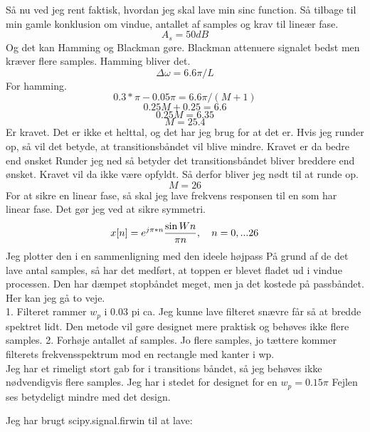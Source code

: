 \begin{Opgaver}
\begin{kapitel}
\begin{Opgave}
\begin{UnderOpgave}
                Så nu ved jeg rent faktisk, hvordan jeg skal lave min sinc function. 
                Så tilbage til min gamle konklusion om vindue, antallet af samples og krav til lineær fase.
                \[A_s = 50dB\]
                Og det kan Hamming og Blackman gøre. 
                Blackman attenuere signalet bedst men kræver flere samples.
                Hamming bliver det. 
                \[\Delta \omega = 6.6\pi / L \] 
                For hamming. 
                \[0.3 * \pi - 0.05 \pi = 6.6 \pi / (M + 1)\]
                \[0.25M + 0.25 = 6.6\]
                \[0.25M = 6.35 \]
                \[M = 25.4\]
                Er kravet. Det er ikke et helttal, og det har jeg brug for at det er. 
                Hvis jeg runder op, så vil det betyde, at transitionsbåndet vil blive mindre. Kravet er da bedre end ønsket
                Runder jeg ned så betyder det transitionsbåndet bliver breddere end ønsket.   Kravet vil da ikke være opfyldt.
                Så derfor bliver jeg nødt til at runde op. 
                \[M = 26\]
                For at sikre en linear fase, så skal jeg lave frekvens responsen til en som har linear fase.
                Det gør jeg ved at sikre symmetri. 
                \[x[n] = e^{j\pi*n}\frac{\sin Wn}{\pi n}, \tab{0} n = 0, ... 26\]
                Jeg plotter den i en sammenligning med den ideele højpass
                På grund af de det lave antal samples, så har det medført, at toppen er blevet fladet ud i vindue processen. 
                Den har dæmpet stopbåndet meget, men ja det kostede på passbåndet. 
                Her kan jeg gå to veje. \\
                1. Filteret rammer $w_p$ i 0.03 pi ca. Jeg kunne lave filteret snævre får så at bredde spektret lidt. 
                Den metode vil gøre designet mere praktisk og behøves ikke flere samples. 
                2. Forhøje antallet af samples. Jo flere samples, jo tættere kommer filterets frekvensspektrum mod en rectangle med kanter i wp. \\
                Jeg har et rimeligt stort gab for i transitions båndet, så jeg behøves ikke nødvendigvis flere samples.
                Jeg har i stedet for designet for en $w_p = 0.15\pi$
                Fejlen ses betydeligt mindre med det design.
            \end{UnderOpgave}
            \begin{UnderOpgave}
                Jeg har brugt scipy.signal.firwin til at lave: 

\end{UnderOpgave}
\end{Opgave}
\end{kapitel}
\end{Opgaver}

